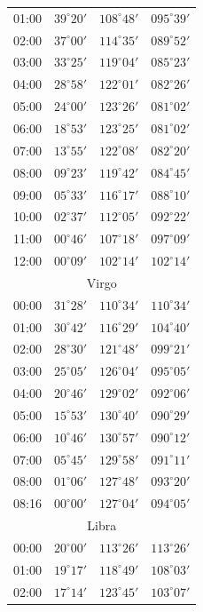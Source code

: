 \begin{table}[!h]
\begin{Parallel}{}{}
{{\begin{tabular}{l|lll}
01:00 & $39^\circ 20'$ & $108^\circ 48'$& $095^\circ 39'$ \\
02:00 & $37^\circ 00'$ & $114^\circ 35'$& $089^\circ 52'$ \\
03:00 & $33^\circ 25'$ & $119^\circ 04'$& $085^\circ 23'$ \\
04:00 & $28^\circ 58'$ & $122^\circ 01'$& $082^\circ 26'$ \\
05:00 & $24^\circ 00'$ & $123^\circ 26'$& $081^\circ 02'$ \\
06:00 & $18^\circ 53'$ & $123^\circ 25'$& $081^\circ 02'$ \\
07:00 & $13^\circ 55'$ & $122^\circ 08'$& $082^\circ 20'$ \\
08:00 & $09^\circ 23'$ & $119^\circ 42'$& $084^\circ 45'$ \\
09:00 & $05^\circ 33'$ & $116^\circ 17'$& $088^\circ 10'$ \\
10:00 & $02^\circ 37'$ & $112^\circ 05'$& $092^\circ 22'$ \\
11:00 & $00^\circ 46'$ & $107^\circ 18'$& $097^\circ 09'$ \\
12:00 & $00^\circ 09'$ & $102^\circ 14'$& $102^\circ 14'$ \\
\multicolumn{4}{c}{Virgo}\\
00:00 & $31^\circ 28'$ & $110^\circ 34'$& $110^\circ 34'$ \\
01:00 & $30^\circ 42'$ & $116^\circ 29'$& $104^\circ 40'$ \\
02:00 & $28^\circ 30'$ & $121^\circ 48'$& $099^\circ 21'$ \\
03:00 & $25^\circ 05'$ & $126^\circ 04'$& $095^\circ 05'$ \\
04:00 & $20^\circ 46'$ & $129^\circ 02'$& $092^\circ 06'$ \\
05:00 & $15^\circ 53'$ & $130^\circ 40'$& $090^\circ 29'$ \\
06:00 & $10^\circ 46'$ & $130^\circ 57'$& $090^\circ 12'$ \\
07:00 & $05^\circ 45'$ & $129^\circ 58'$& $091^\circ 11'$ \\
08:00 & $01^\circ 06'$ & $127^\circ 48'$& $093^\circ 20'$ \\
08:16 & $00^\circ 00'$ & $127^\circ 04'$& $094^\circ 05'$ \\
\multicolumn{4}{c}{Libra}\\
00:00 & $20^\circ 00'$ & $113^\circ 26'$& $113^\circ 26'$ \\
01:00 & $19^\circ 17'$ & $118^\circ 49'$& $108^\circ 03'$ \\
02:00 & $17^\circ 14'$ & $123^\circ 45'$& $103^\circ 07'$ \\

\end{tabular}}}
\end{Parallel}
\end{table}

